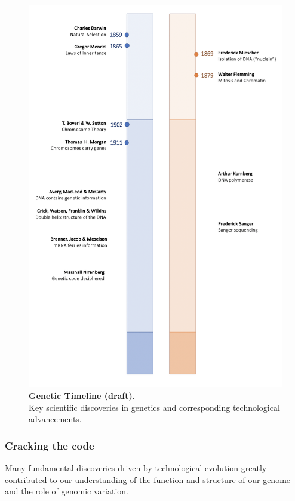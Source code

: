 \begin{figure}[htbp]
\centering
\includegraphics[width=13cm]{Chapter1/Fig/genetic_timeline_draft.png}
\caption[\textbf{Genetic Timeline}]{\textbf{Genetic Timeline (draft)}.\\
Key scientific discoveries in genetics and corresponding technological advancements.}
\label{fig:genetic_timeline}
\end{figure}

\subsubsection{Cracking the code}

Many fundamental discoveries driven by technological evolution greatly contributed to
our understanding of the function and structure of our genome and the role of genomic variation.\\

